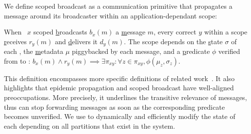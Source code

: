 %

We define scoped broadcast as a communication primitive that
propagates a message around its broadcaster within an
application-dependant scope:


\begin{definition}
  When \Process~$x$ scoped \underline{b}roadcasts $b_x(m)$ a
  \underline{m}essage $m$, every correct \process $y$ within a scope
  \underline{r}eceives $r_y(m)$ and \underline{d}elivers it
  $d_y(m)$. The scope depends on the \underline{s}tate $\sigma$ of
  each \process, the \underline{m}etadata $\mu$ piggybacked by each
  message, and a \underline{p}redicate $\phi$ verified from \process to
  \process: {\small{$b_x(m) \wedge r_y(m) \implies \exists \pi_{xy}: \forall z
  \in \pi_{xy}, \phi(\mu_z, \sigma_z)$}}.
\end{definition}

This definition encompasses more specific definitions of related
work~\cite{hsiao2005scoped, lue2006scoped, wang2015prodiluvian}.  It
also highlights that epidemic propagation and scoped broadcast have
well-aligned preoccupations. More precisely, it underlines the transitive relevance of
messages, thus \processes can stop forwarding messages as soon as the
corresponding predicate becomes unverified.
%
We use \NAMEB to dynamically and efficiently modify the state of each
\process depending on all partitions that exist in the system.

